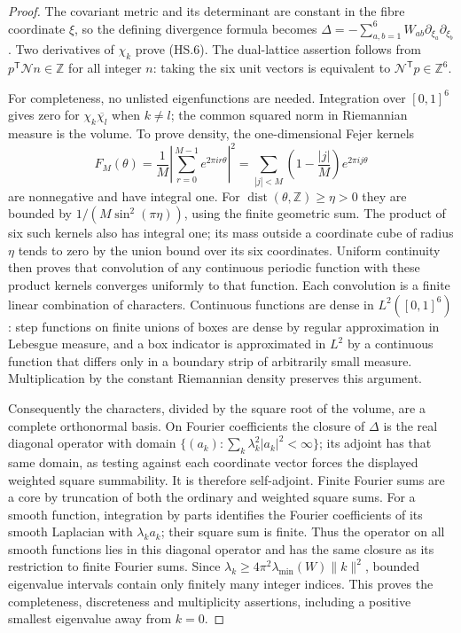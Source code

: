 \begin{proof}
The covariant metric and its determinant are constant in the fibre
coordinate $\xi$, so the defining divergence formula becomes
$\Delta=-\sum_{a,b=1}^6W_{ab}\partial_{\xi_a}\partial_{\xi_b}$.
Two derivatives of $\chi_k$ prove (HS.6). The dual-lattice assertion
follows from $p^{\mathsf T}\mathcal Nn\in\mathbb Z$ for all integer
$n$: taking the six unit vectors is equivalent to
$\mathcal N^{\mathsf T}p\in\mathbb Z^6$.

For completeness, no unlisted eigenfunctions are needed. Integration
over $[0,1]^6$ gives zero for $\chi_k\overline{\chi_l}$ when $k\ne l$;
the common squared norm in Riemannian measure is the volume.
To prove density, the one-dimensional Fejer kernels
\[
 F_M(\theta)=\frac1M\left|\sum_{r=0}^{M-1}e^{2\pi i r\theta}\right|^2
 =\sum_{|j|<M}\left(1-\frac{|j|}{M}\right)e^{2\pi i j\theta}
\]
are nonnegative and have integral one. For
$\operatorname{dist}(\theta,\mathbb Z)\geq\eta>0$ they are bounded by
$1/(M\sin^2(\pi\eta))$, using the finite geometric sum. The product
of six such kernels also has integral one; its mass outside a
coordinate cube of radius $\eta$ tends to zero by the union bound
over its six coordinates. Uniform continuity then proves that
convolution of any continuous periodic function with these product
kernels converges uniformly to that function. Each convolution is a
finite linear combination of characters. Continuous functions are dense
in $L^2([0,1]^6)$: step functions on finite unions of boxes are dense
by regular approximation in Lebesgue measure, and a box indicator is
approximated in $L^2$ by a continuous function that differs only in a
boundary strip of arbitrarily small measure. Multiplication by the
constant Riemannian density preserves this argument.

Consequently the characters, divided by the square root of the volume,
are a complete orthonormal basis. On Fourier coefficients the closure of
$\Delta$ is the real diagonal operator with domain
$\{(a_k):\sum_k\lambda_k^2|a_k|^2<\infty\}$; its adjoint has that same
domain, as testing against each coordinate vector forces the displayed
weighted square summability. It is therefore self-adjoint.
Finite Fourier sums are a core by truncation of both the ordinary
and weighted square sums. For a smooth function, integration by parts
identifies the Fourier coefficients of its smooth Laplacian with
$\lambda_k a_k$; their square sum is finite. Thus the operator on all
smooth functions lies in this diagonal operator and has the same
closure as its restriction to finite Fourier sums. Since
$\lambda_k\geq4\pi^2\lambda_{\min}(W)\|k\|^2$, bounded eigenvalue
intervals contain only finitely many integer indices. This proves
the completeness, discreteness and multiplicity assertions, including
a positive smallest eigenvalue away from $k=0$.


\end{proof}
